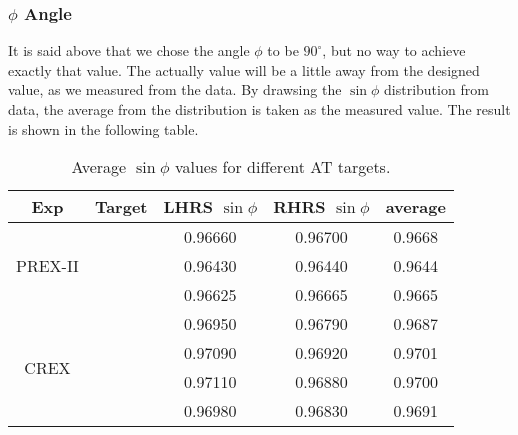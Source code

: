 \subsubsection{$\phi$ Angle}
It is said above that we chose the angle $\phi$ to be $90^\circ$, but no way to 
achieve exactly that value. The actually value will be a little away from
the designed value, as we measured from the data. By drawsing the $\sin\phi$ distribution
from data, the average from the distribution is taken as the measured value. 
The result is shown in the following table.
\begin{table}[!htbp]
    \centering
    \begin{tabular}{c c | c c c}
	\hline
	Exp & Target	& LHRS $\sin\phi$   & RHRS $\sin\phi$	& average   \\
	\hline
	\multirow{3}{*}{PREX-II}
	    & \Carbon    & 0.96660   & 0.96700	& 0.9668    \\ 
	    & \ca   & 0.96430   & 0.96440	& 0.9644    \\ 
	    & \Pb   & 0.96625   & 0.96665	& 0.9665    \\ 
	\hline
	\multirow{4}{*}{CREX}
	    & \Carbon    & 0.96950   & 0.96790	& 0.9687    \\ 
	    & \ca   & 0.97090   & 0.96920	& 0.9701    \\ 
	    & \Ca   & 0.97110   & 0.96880	& 0.9700    \\ 
	    & \Pb   & 0.96980   & 0.96830	& 0.9691    \\ 
	\hline
    \end{tabular}
    \caption{Average $\sin\phi$ values for different AT targets.}
\end{table}

